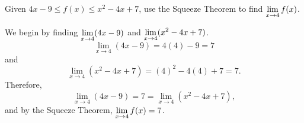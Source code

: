 \begin{example}\label{Ex:1.1.Eg9}
Given $4x-9 \leq f(x) \leq x^2-4x+7$, use the Squeeze Theorem to find $\displaystyle \lim_{x \to 4} f(x)$.

\solution We begin by finding $\displaystyle \lim_{x \to 4} (4x-9)$ and \newline $\displaystyle \lim_{x \to 4} (x^2-4x+7)$. 
\[ \lim_{x \to 4} (4x-9) = 4(4)-9 = 7 \]
and 
\[ \lim_{x \to 4} (x^2-4x+7) = (4)^2-4(4)+7 = 7. \]
Therefore,
\[ \lim_{x \to 4} (4x-9) = 7 = \lim_{x \to 4} (x^2-4x+7),\]
and by the Squeeze Theorem, $\displaystyle \lim_{x \to 4} f(x) = 7$.
\end{example}